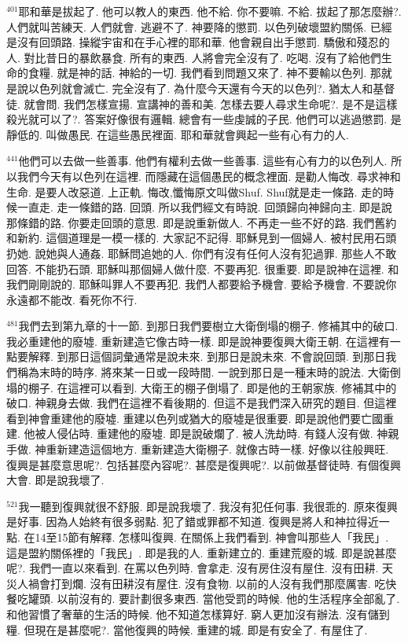 \documentclass{book}
\begin{document}
$^{401}$耶和華是拔起了.
他可以教人的東西.
他不給.
你不要嘛.
不給.
拔起了那怎麼辦?.
人們就叫苦練天.
人們就會.
逃避不了.
神要降的懲罰.
以色列破壞盟約關係.
已經是沒有回頭路.
操縱宇宙和在手心裡的耶和華.
他會親自出手懲罰.
驕傲和殘忍的人.
對比昔日的暴飲暴食.
所有的東西.
人將會完全沒有了.
吃喝.
沒有了給他們生命的食糧.
就是神的話.
神給的一切.
我們看到問題又來了.
神不要輸以色列.
那就是說以色列就會滅亡.
完全沒有了.
為什麼今天還有今天的以色列?.
猶太人和基督徒.
就會問.
我們怎樣宣揚.
宣講神的善和美.
怎樣去要人尋求生命呢?.
是不是這樣殺光就可以了?.
答案好像很有邏輯.
總會有一些虔誠的子民.
他們可以逃過懲罰.
是靜低的.
叫做愚民.
在這些愚民裡面.
耶和華就會興起一些有心有力的人.

$^{441}$他們可以去做一些善事.
他們有權利去做一些善事.
這些有心有力的以色列人.
所以我們今天有以色列在這裡.
而隱藏在這個愚民的概念裡面.
是勸人悔改.
尋求神和生命.
是要人改惡道.
上正軌.
悔改,懺悔原文叫做Shuf.
Shuf就是走一條路.
走的時候一直走.
走一條錯的路.
回頭.
所以我們經文有時說.
回頭歸向神歸向主.
即是說那條錯的路.
你要走回頭的意思.
即是說重新做人.
不再走一些不好的路.
我們舊約和新約.
這個道理是一模一樣的.
大家記不記得.
耶穌見到一個婦人.
被村民用石頭扔她.
說她與人通姦.
耶穌問追她的人.
你們有沒有任何人沒有犯過罪.
那些人不敢回答.
不能扔石頭.
耶穌叫那個婦人做什麼.
不要再犯.
很重要.
即是說神在這裡.
和我們剛剛說的.
耶穌叫罪人不要再犯.
我們人都要給予機會.
要給予機會.
不要說你永遠都不能改.
看死你不行.

$^{481}$我們去到第九章的十一節.
到那日我們要樹立大衛倒塌的棚子.
修補其中的破口.
我必重建他的廢墟.
重新建造它像古時一樣.
即是說神要復興大衛王朝.
在這裡有一點要解釋.
到那日這個詞彙通常是說未來.
到那日是說未來.
不會說回頭.
到那日我們稱為末時的時序.
將來某一日或一段時間.
一說到那日是一種末時的說法.
大衛倒塌的棚子.
在這裡可以看到.
大衛王的棚子倒塌了.
即是他的王朝家族.
修補其中的破口.
神親身去做.
我們在這裡不看後期的.
但這不是我們深入研究的題目.
但這裡看到神會重建他的廢墟.
重建以色列或猶大的廢墟是很重要.
即是說他們要亡國重建.
他被人侵佔時.
重建他的廢墟.
即是說破爛了.
被人洗劫時.
有錢人沒有做.
神親手做.
神重新建造這個地方.
重新建造大衛棚子.
就像古時一樣.
好像以往般興旺.
復興是甚麼意思呢?.
包括甚麼內容呢?.
甚麼是復興呢?.
以前做基督徒時.
有個復興大會.
即是說我壞了.

$^{521}$我一聽到復興就很不舒服.
即是說我壞了.
我沒有犯任何事.
我很乖的.
原來復興是好事.
因為人始終有很多弱點.
犯了錯或罪都不知道.
復興是將人和神拉得近一點.
在14至15節有解釋.
怎樣叫復興.
在關係上我們看到.
神會叫那些人「我民」.
這是盟約關係裡的「我民」.
即是我的人.
重新建立的.
重建荒廢的城.
即是說甚麼呢?.
我們一直以來看到.
在罵以色列時.
會拿走.
沒有房住沒有屋住.
沒有田耕.
天災人禍會打到爛.
沒有田耕沒有屋住.
沒有食物.
以前的人沒有我們那麼厲害.
吃快餐吃罐頭.
以前沒有的.
要計劃很多東西.
當他受罰的時候.
他的生活程序全部亂了.
和他習慣了奢華的生活的時候.
他不知道怎樣算好.
窮人更加沒有辦法.
沒有儲到糧.
但現在是甚麼呢?.
當他復興的時候.
重建的城.
即是有安全了.
有屋住了.
\end{document}
